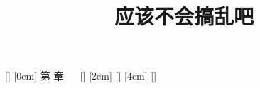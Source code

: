 
\title{应该不会搞乱吧}
\author{}
\date{}

\usepackage{ctex}%
\usepackage[top=2.54cm, bottom=2.54cm, left=3.17cm, right=3.17cm]{geometry} %
\usepackage{fontspec}%
\usepackage{setspace}%
\usepackage{changepage}%
\usepackage{ragged2e}%
\usepackage{amsmath,amsfonts}%
\setmainfont{TeX Gyre Termes}%
\linespread{1.5}%
\usepackage{url}%
\usepackage{verbatim}%

\usepackage{fancyhdr}%
\pagestyle{fancy}
\fancyhf{}
\fancyfoot[C]{\thepage}           %
\renewcommand{\headrulewidth}{0.5pt}    %


\newcommand{\enabstractname}{{\texttt{[image: ABSTRACT-sun.pdf]}}}
\newcommand{\cnabstractname}{\LARGE{摘 \qquad 要}}
\newenvironment{enabstract}{%
  \par
  \noindent\mbox{}\hfill{\bfseries \enabstractname}\hfill\mbox{}\par
  \vskip 2.5ex}{\par\vskip 2.5ex}
\newenvironment{cnabstract}{%
  \par
  \noindent\mbox{}\hfill{\bf \cnabstractname}\hfill\mbox{}\par
  \vskip 2.5ex}{\par\vskip 2.5ex}

\usepackage[newparttoc,indentafter]{titlesec}%
\usepackage{titletoc}%
\renewcommand\contentsname{目\hspace{1em}录}
[]{\heiti {}}{}{}{}
[0em]{\heiti {} }{第 \thecontentslabel 章 ~~ }{}{\hspace{0.5em}\hspace{-0.5em}\contentspage}[\vspace{0.3em}]
[2em]{\heiti {} }{\contentslabel{2em}}{}{\hspace{0.5em}\hspace{-1em}\contentspage}[\vspace{0.3em}]
[4em]{\songti {} }{\contentslabel{3em}}{}{\hspace{0.5em}\hspace{-1em}\contentspage}[\vspace{0.3em}]
\usepackage{hyperref} %

